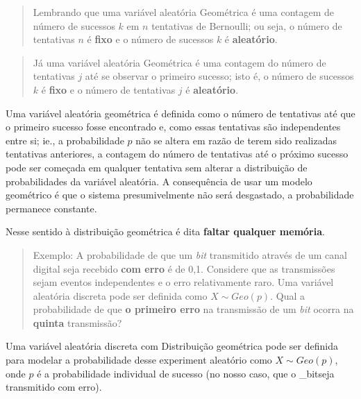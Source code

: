\documentclass[
]{book}
\begin{document}
\hfill\break

\begin{quote}
Lembrando que uma variável aleatória Geométrica é uma contagem de número de sucessos \(k\) em \(n\) tentativas de Bernoulli; ou seja, o número de tentativas \(n\) é \textbf{fixo} e o número de sucessos \(k\) é \textbf{aleatório}.
\end{quote}

\hfill\break

\begin{quote}
Já uma variável aleatória Geométrica é uma contagem do número de tentativas \(j\) até se observar o primeiro sucesso; isto é, o número de sucessos \(k\) é \textbf{fixo} e o número de tentativas \(j\) é \textbf{aleatório}.
\end{quote}

\hfill\break

Uma variável aleatória geométrica é definida como o número de tentativas até que o primeiro sucesso fosse encontrado e, como essas tentativas são independentes entre si; ie., a probabilidade \(p\) não se altera em razão de terem sido realizadas tentativas anteriores, a contagem do número de tentativas até o próximo sucesso pode ser começada em qualquer tentativa sem alterar a distribuição de probabilidades da variável aleatória. A consequência de usar um modelo geométrico é que o sistema presumivelmente não será desgastado, a probabilidade permanece constante.

\hfill\break

Nesse sentido à distribuição geométrica é dita \textbf{faltar qualquer memória}.

\hfill\break

\begin{quote}
Exemplo: A probabilidade de que um \emph{bit} transmitido através de um canal digital seja recebido \textbf{com erro} é de 0,1. Considere que as transmissões sejam eventos independentes e o erro relativamente raro. Uma variável aleatória discreta pode ser definida como \(X\sim Geo(p)\). Qual a probabilidade de que \textbf{o primeiro erro} na transmissão de um \emph{bit} ocorra na \textbf{quinta} transmissão?
\end{quote}

\hfill\break

Uma variável aleatória discreta com Distribuição geométrica pode ser definida para modelar a probabilidade desse experiment aleatório como \(X\sim Geo(p)\), onde \(p\) é a probabilidade individual de sucesso (no nosso caso, que o \_bitseja transmitido com erro).
\end{document}
